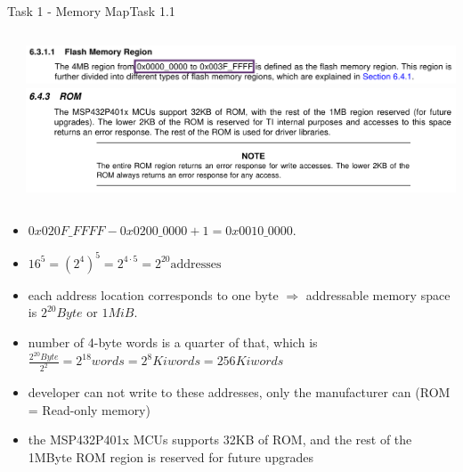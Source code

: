 {\begin{frame}[allowframebreaks]{Task 1 - Memory Map}{Task 1.1\vspace{0.25cm}}
\begin{solutionnoinc}
\begin{columns}
\begin{column}{0.3\paperwidth}
      \end{column}
      \begin{column}{0.7\paperwidth}
        \includegraphics[height=0.095\paperheight]{./figures/rom2.png}
        \includegraphics[height=0.25\paperheight]{./figures/rom3.png}
      \end{column}
    \end{columns}
    \begin{itemize}
      \item $0x020F\_FFFF - 0x0200\_0000 + 1 = 0x0010\_0000$.
      \item $16^5 = {(2^4)}^5 = 2^{4\cdot 5} = 2^{20} \text{addresses}$
    \end{itemize}
  \end{solutionnoinc}
  \begin{solution}
    \begin{itemize}
      \item each address location corresponds to \alert{one byte} $\Rightarrow$ \alert{addressable memory space} is $2^{20} Byte$ or $1 MiB$.
      \item number of 4-byte words is a \alert{quarter} of that, which is $\frac{2^{20} Byte}{2^2} = 2^{18} words = 2^8 Kiwords= 256 Kiwords$
    \end{itemize}
  \end{solution}
  \begin{Sidenote}
    \begin{itemize}
      \item developer can not write to these addresses, only the manufacturer can (ROM = \alert{R}ead-\alert{o}nly \alert{m}emory)
      \item the MSP432P401x MCUs supports 32KB of ROM, and the rest of the 1MByte ROM region is reserved for \alert{future upgrades}
    \end{itemize}
  \end{Sidenote}
\end{frame}
}\fi

